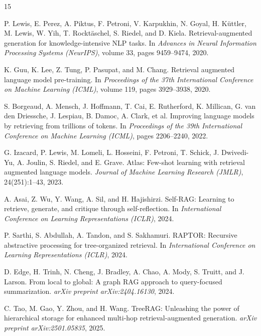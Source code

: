 \documentclass[12pt,a4paper]{report}
\begin{document}
\begin{thebibliography}{15}

P. Lewis, E. Perez, A. Piktus, F. Petroni, V. Karpukhin, N. Goyal, H. K\"{u}ttler, M. Lewis, W. Yih, T. Rock\-t\"{a}schel, S. Riedel, and D. Kiela.
Retrieval-\hspace{0pt}augmented generation for knowledge-intensive NLP tasks.
In \textit{Advances in Neural Information Processing Systems (NeurIPS)}, volume 33, pages 9459--9474, 2020.

K. Guu, K. Lee, Z. Tung, P. Pasupat, and M. Chang.
Retrieval augmented language model pre-training.
In \textit{Proceedings of the 37th International Conference on Machine Learning (ICML)}, volume 119, pages 3929--3938, 2020.

S. Borgeaud, A. Mensch, J. Hoffmann, T. Cai, E. Rutherford, K. Millican, G. van den Driessche, J. Lespiau, B. Damoc, A. Clark, et al.
Improving language models by retrieving from trillions of tokens.
In \textit{Proceedings of the 39th International Conference on Machine Learning (ICML)}, pages 2206--2240, 2022.

G. Izacard, P. Lewis, M. Lomeli, L. Hosseini, F. Petroni, T. Schick, J. Dwivedi-Yu, A. Joulin, S. Riedel, and E. Grave.
Atlas: Few-shot learning with retrieval augmented language models.
\textit{Journal of Machine Learning Research (JMLR)}, 24(251):1--43, 2023.

A. Asai, Z. Wu, Y. Wang, A. Sil, and H. Hajishirzi.
Self-RAG: Learning to retrieve, generate, and critique through self-reflection.
In \textit{International Conference on Learning Representations (ICLR)}, 2024.

P. Sarthi, S. Abdullah, A. Tandon, and S. Sakhamuri.
RAPTOR: Recursive abstractive processing for tree-organized retrieval.
In \textit{International Conference on Learning Representations (ICLR)}, 2024.

D. Edge, H. Trinh, N. Cheng, J. Bradley, A. Chao, A. Mody, S. Truitt, and J. Larson.
From local to global: A graph RAG approach to query-focused summarization.
\textit{arXiv preprint arXiv:2404.16130}, 2024.

C. Tao, M. Gao, Y. Zhou, and H. Wang.
TreeRAG: Unleashing the power of hierarchical storage for enhanced multi-hop retrieval-augmented generation.
\textit{arXiv preprint arXiv:2501.05835}, 2025.


\end{thebibliography}
\end{document}
